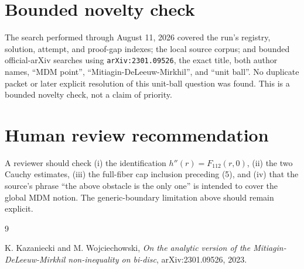 \documentclass[11pt]{article}
\begin{document}
\section*{Bounded novelty check}

The search performed through August 11, 2026 covered the run's registry,
solution, attempt, and proof-gap indexes; the local source corpus; and bounded
official-arXiv searches using \nolinkurl{arXiv:2301.09526}, the exact title, both author
names, ``MDM point'', ``Mitiagin-DeLeeuw-Mirkhil'', and ``unit ball''.  No
duplicate packet or later explicit resolution of this unit-ball question was
found.  This is a bounded novelty check, not a claim of priority.

\section*{Human review recommendation}

A reviewer should check (i) the identification
\(h''(r)=F_{112}(r,0)\), (ii) the two Cauchy estimates, (iii) the full-fiber cap
inclusion preceding (5), and (iv) that the source's phrase ``the above obstacle
is the only one'' is intended to cover the global MDM notion.  The
generic-boundary limitation above should remain explicit.

\begin{thebibliography}{9}

K. Kazaniecki and M. Wojciechowski,
\emph{On the analytic version of the Mitiagin-DeLeeuw-Mirkhil
non-inequality on bi-disc}, arXiv:2301.09526, 2023.

\end{thebibliography}
\end{document}

